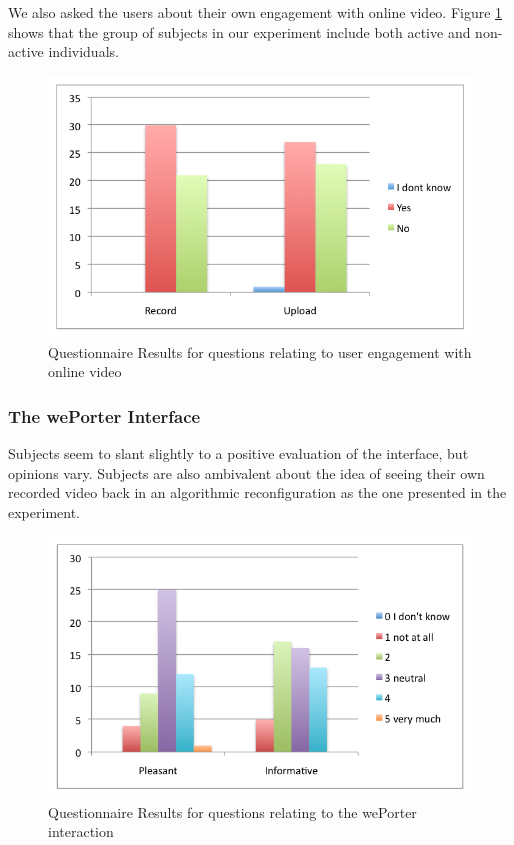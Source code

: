 We also asked the users about their own engagement with online video. Figure \ref{fig:quest_own_content} shows that the group of subjects in our experiment include both active and non-active individuals.

\begin{figure}[htbp]
  \centering
    \includegraphics[width=.6\textwidth]{img/evaluation/quest_video}
  \caption{Questionnaire Results for questions relating to user engagement with online video}
  \label{fig:quest_own_content}
\end{figure}


\subsubsection{The wePorter Interface} 

Subjects seem to slant slightly to a positive evaluation of the interface, but opinions vary. Subjects are also ambivalent about the idea of seeing their own recorded video back in an algorithmic reconfiguration as the one presented in the experiment.

\begin{figure}[htbp]
  \centering
    \includegraphics[width=.6\textwidth]{img/evaluation/quest_interaction}
  \caption{Questionnaire Results for questions relating to the wePorter interaction}
  \label{fig:quest_interactions}
\end{figure}

